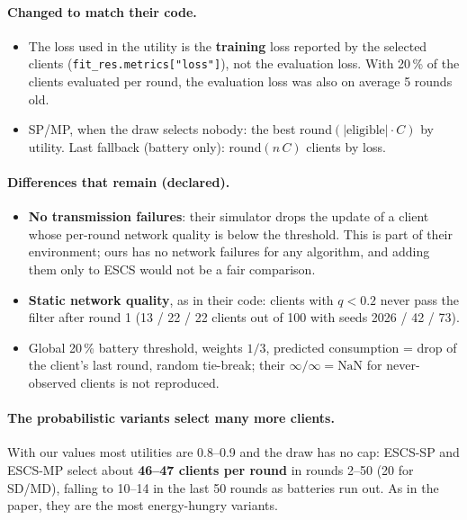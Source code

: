 \documentclass[11pt,a4paper]{article}
\begin{document}
\paragraph{Changed to match their code.}
\begin{itemize}
  \item The loss used in the utility is the \textbf{training} loss reported by
        the selected clients (\texttt{fit\_res.metrics["loss"]}), not the
        evaluation loss. With 20\,\% of the clients evaluated per round, the
        evaluation loss was also on average 5 rounds old.
  \item SP/MP, when the draw selects nobody: the best round$(|\text{eligible}|\cdot C)$
        by utility. Last fallback (battery only): round$(n\,C)$ clients by loss.
\end{itemize}

\paragraph{Differences that remain (declared).}
\begin{itemize}
  \item \textbf{No transmission failures}: their simulator drops the update of a
        client whose per-round network quality is below the threshold. This is
        part of their environment; ours has no network failures for any
        algorithm, and adding them only to ESCS would not be a fair comparison.
  \item \textbf{Static network quality}, as in their code: clients with $q<0.2$
        never pass the filter after round 1 (13 / 22 / 22 clients out of 100 with
        seeds 2026 / 42 / 73).
  \item Global 20\,\% battery threshold, weights $1/3$, predicted consumption =
        drop of the client's last round, random tie-break; their
        $\infty/\infty=\text{NaN}$ for never-observed clients is not reproduced.
\end{itemize}

\paragraph{The probabilistic variants select many more clients.} With our
values most utilities are 0.8--0.9 and the draw has no cap: ESCS-SP and ESCS-MP
select about \textbf{46--47 clients per round} in rounds 2--50 (20 for SD/MD),
falling to 10--14 in the last 50 rounds as batteries run out. As in the paper,
they are the most energy-hungry variants.
\end{document}
